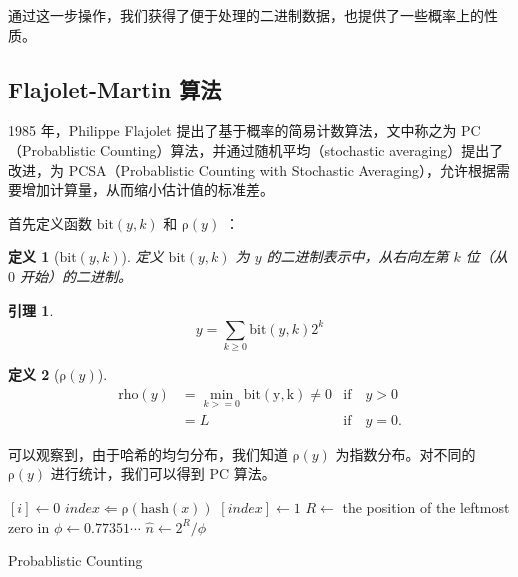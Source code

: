 \documentclass{ctexart}
\newtheorem{definition}{\hspace{2em} 定义}[subsection]
\newtheorem{corollary}{\hspace{2em} 引理}[subsection]
\begin{document}
    通过这一步操作，我们获得了便于处理的二进制数据，也提供了一些概率上的性质。

\subsection{Flajolet-Martin 算法 \cite{Flajolet:1985ixa}}

    1985 年，Philippe Flajolet 提出了基于概率的简易计数算法，文中称之为 PC（Probablistic Counting）算法，并通过随机平均（stochastic averaging）提出了改进，为 PCSA（Probablistic Counting with Stochastic Averaging），允许根据需要增加计算量，从而缩小估计值的标准差。

    首先定义函数 $\mathrm{bit}(y,k)$ 和 $\mathrm{\rho}(y)$ ：

    \begin{definition}[$\mathrm{bit}(y,k)$]
        定义 $\mathrm{bit}(y,k)$ 为 $y$ 的二进制表示中，从右向左第 $k$ 位（从 $0$ 开始）的二进制。
    \end{definition}

    \begin{corollary}
        \begin{equation*}
            y = \sum_{k \ge 0}{\mathrm{bit}(y, k) 2^k}
        \end{equation*}
    \end{corollary}

    \begin{definition}[$\mathrm{\rho}(y)$]
        \begin{align*}
            \mathrm{rho}(y) &= \min_{k >= 0} \mathrm{bit(y, k)} \ne 0 &\mathrm{if} \quad y > 0 \\
                &= L &\mathrm{if} \quad y = 0.
        \end{align*}
    \end{definition}

    可以观察到，由于哈希的均匀分布，我们知道 $\mathrm{\rho}(y)$ 为指数分布。对不同的 $\mathrm{\rho}(y)$ 进行统计，我们可以得到 PC 算法。

    \begin{algorithm}
        \BlankLine
         {
            \Bitmap $[i] \leftarrow 0$\;
        }
         {
            $index \Leftarrow \mathrm{\rho}(\mathrm{hash}(x))$\;
             {
                \Bitmap $\left[index\right] \leftarrow 1$\;
            }
        }
        $R \leftarrow$ the position of the leftmost zero in \Bitmap \;
        $\phi \leftarrow 0.77351 \cdots$ \;
        $\hat{n} \leftarrow 2^R/\phi$ \;
        \caption{Probablistic Counting}
    \end{algorithm}
\end{document}
